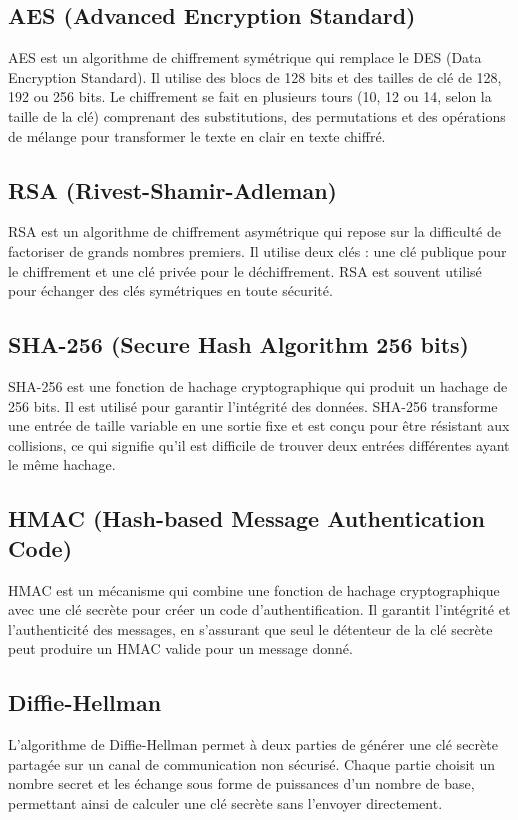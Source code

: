 \documentclass[a4paper,12pt]{report}
\begin{document}
	\subsection{AES (Advanced Encryption Standard)}
	AES est un algorithme de chiffrement symétrique qui remplace le DES (Data Encryption Standard). Il utilise des blocs de 128 bits et des tailles de clé de 128, 192 ou 256 bits. Le chiffrement se fait en plusieurs tours (10, 12 ou 14, selon la taille de la clé) comprenant des substitutions, des permutations et des opérations de mélange pour transformer le texte en clair en texte chiffré.
	
	\subsection{RSA (Rivest-Shamir-Adleman)}
	RSA est un algorithme de chiffrement asymétrique qui repose sur la difficulté de factoriser de grands nombres premiers. Il utilise deux clés : une clé publique pour le chiffrement et une clé privée pour le déchiffrement. RSA est souvent utilisé pour échanger des clés symétriques en toute sécurité.
	
	\subsection{SHA-256 (Secure Hash Algorithm 256 bits)}
	SHA-256 est une fonction de hachage cryptographique qui produit un hachage de 256 bits. Il est utilisé pour garantir l'intégrité des données. SHA-256 transforme une entrée de taille variable en une sortie fixe et est conçu pour être résistant aux collisions, ce qui signifie qu'il est difficile de trouver deux entrées différentes ayant le même hachage.
	
	\subsection{HMAC (Hash-based Message Authentication Code)}
	HMAC est un mécanisme qui combine une fonction de hachage cryptographique avec une clé secrète pour créer un code d'authentification. Il garantit l'intégrité et l'authenticité des messages, en s'assurant que seul le détenteur de la clé secrète peut produire un HMAC valide pour un message donné.
	
	\subsection{Diffie-Hellman}
	L'algorithme de Diffie-Hellman permet à deux parties de générer une clé secrète partagée sur un canal de communication non sécurisé. Chaque partie choisit un nombre secret et les échange sous forme de puissances d'un nombre de base, permettant ainsi de calculer une clé secrète sans l'envoyer directement.
	
\end{document}
